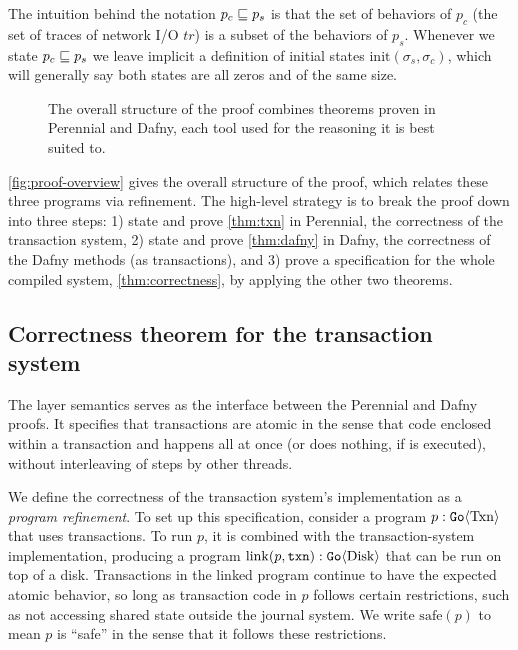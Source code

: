 The intuition behind the notation $p_{c} \sqsubseteq p_{s}$ is that the set of
behaviors of $p_{c}$ (the set of traces of network I/O $tr$) is a subset of the
behaviors of $p_{s}$. Whenever we state $p_{c} \sqsubseteq p_{s}$ we leave implicit
a definition of initial states $\mathrm{init}(\sigma_{s}, \sigma_{c})$, which
will generally say both states are all zeros and of the same size.

\begin{figure}[ht]
  \center
  
  \caption{The overall structure of the proof combines theorems proven in Perennial
    and Dafny, each tool used for the reasoning it is best suited to.}
  \label{fig:proof-overview}
\end{figure}

\autoref{fig:proof-overview} gives the overall structure of the proof, which
relates these three programs via refinement. The high-level strategy is to break the proof down
into three steps: 1) state and prove \autoref{thm:txn} in Perennial, the correctness
of the transaction system, 2) state and prove \autoref{thm:dafny} in Dafny, the
correctness of the Dafny methods (as transactions), and 3) prove a specification
for the whole compiled system, \autoref{thm:correctness}, by applying the other
two theorems.


\subsection{Correctness theorem for the transaction system}
\label{sec:proof:txn}

The  layer semantics serves as the interface between the Perennial and Dafny
proofs.  It specifies that transactions are atomic in the sense that code
enclosed within a transaction  and  happens all at once (or
does nothing, if  is executed), without interleaving of steps by other
threads.

We define the correctness of the transaction system's implementation as a
\emph{program refinement}.
To set up this specification, consider a program $p : \mathtt{Go}\langle \mathrm{Txn} \rangle$ that
uses transactions.
To run $p$, it is combined with the transaction-system implementation, producing
a program $\mathrm{link}(p, \texttt{txn}) : \mathtt{Go}\langle \mathrm{Disk} \rangle$ that can be run on
top of a disk.
Transactions in the linked program continue to have the expected atomic
behavior, so long as transaction code in $p$ follows certain restrictions, such
as not accessing shared state outside the journal system.  We write
$\mathrm{safe}(p)$ to mean $p$ is ``safe'' in the sense that it follows these restrictions.

